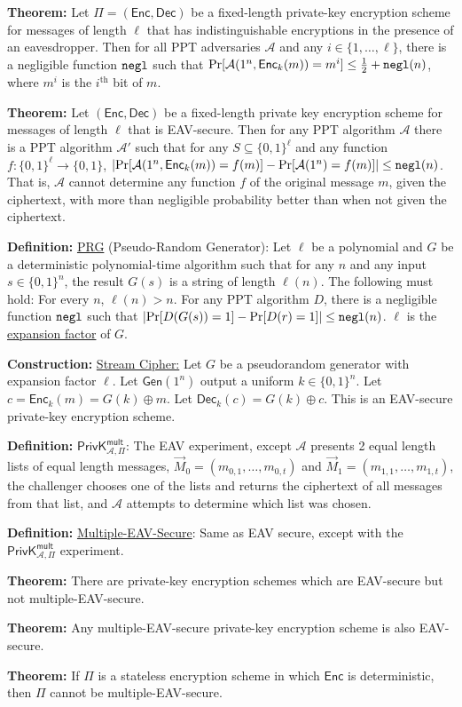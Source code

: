 \documentclass[12pt]{article}
\newcommand{\AAA}{\mathcal{A}}
\newcommand{\defn}[1]{{\bf Definition:} \underline{#1}}
\newcommand{\thm}[1]{{\bf Theorem:} \underline{#1}}
\newcommand{\con}[1]{{\bf Construction:} \underline{#1}}
\newcommand{\Enc}{\mathsf{Enc}}
\newcommand{\Dec}{\mathsf{Dec}}
\newcommand{\Gen}{\mathsf{Gen}}
\newcommand{\ExptMultArgs}[2]{\mathsf{PrivK}^{\mathsf{mult}}_{#1,#2}}
\newcommand{\ExptMult}{\ExptMultArgs{\AAA}{\Pi}}
\newcommand{\xor}{\oplus}
\newcommand{\negl}{{\tt negl}}
\begin{document}
\begin{multicols}{3}
\thm{}Let $\Pi=(\Enc,\Dec)$ be a fixed-length private-key encryption scheme for messages of length $\ell$ that has indistinguishable encryptions in the presence of an eavesdropper. Then for all PPT adversaries $\AAA$ and any $i\in\{1,\dots,\ell\}$, there is a negligible function $\negl$ such that $\Pr[\AAA(1^n,\Enc_k(m))=m^i]\leq\frac{1}{2}+\negl(n)$, where $m^i$ is the $i^{\text{th}}$ bit of $m$.

\thm{}Let $(\Enc,\Dec)$ be a fixed-length private key encryption scheme for messages of length $\ell$ that is EAV-secure. Then for any PPT algorithm $\AAA$ there is a PPT algorithm $\AAA'$ such that for any $S\subseteq\{0,1\}^\ell$ and any function $f:\{0,1\}^\ell\to\{0,1\}$, $\left|\Pr[\AAA(1^n,\Enc_k(m))=f(m)]-\Pr[\AAA(1^n)=f(m)]\right|\leq\negl(n)$. That is, $\AAA$ cannot determine any function $f$ of the original message $m$, given the ciphertext, with more than negligible probability better than when not given the ciphertext.

\defn{PRG} (Pseudo-Random Generator): Let $\ell$ be a polynomial and $G$ be a deterministic polynomial-time algorithm such that for any $n$ and any input $s\in\{0,1\}^n$, the result $G(s)$ is a string of length $\ell(n)$. The following must hold: For every $n$, $\ell(n)>n$. For any PPT algorithm $D$, there is a negligible function $\negl$ such that $\left|\Pr[D(G(s))=1]-\Pr[D(r)=1]\right|\leq\negl(n)$. $\ell$ is the \underline{expansion factor} of $G$.

\con{Stream Cipher:} Let $G$ be a pseudorandom generator with expansion factor $\ell$. Let $\Gen(1^n)$ output a uniform $k\in\{0,1\}^n$. Let $c=\Enc_k(m)=G(k)\xor m$. Let $\Dec_k(c)=G(k)\xor c$. This is an EAV-secure private-key encryption scheme.

\defn{$\ExptMult$}: The EAV experiment, except $\AAA$ presents 2 equal length lists of equal length messages, $\vec{M}_0=(m_{0,1},\dots,m_{0,t})$ and $\vec{M}_1=(m_{1,1},\dots,m_{1,t})$, the challenger chooses one of the lists and returns the ciphertext of all messages from that list, and $\AAA$ attempts to determine which list was chosen.

\defn{Multiple-EAV-Secure}: Same as EAV secure, except with the $\ExptMult$ experiment.

\thm{}There are private-key encryption schemes which are EAV-secure but not multiple-EAV-secure.

\thm{}Any multiple-EAV-secure private-key encryption scheme is also EAV-secure.

\thm{}If $\Pi$ is a stateless encryption scheme in which $\Enc$ is deterministic, then $\Pi$ cannot be multiple-EAV-secure.


\end{multicols}
\end{document}
